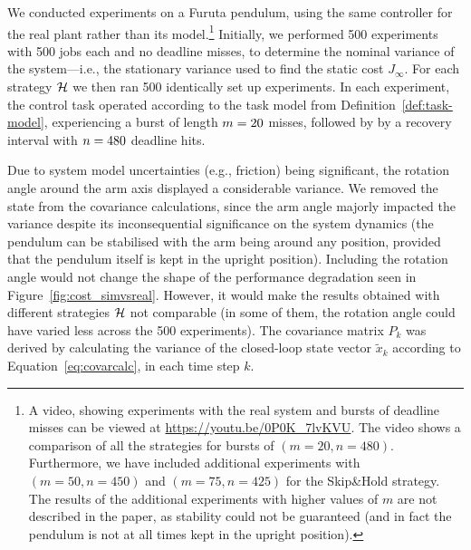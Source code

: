 We conducted experiments on a Furuta pendulum, using the same controller for the real plant rather than its model.\footnote{A video, showing experiments with the real system and bursts of deadline misses can be viewed at \url{https://youtu.be/0P0K_7lvKVU}. The video shows a comparison of all the strategies for bursts of $(m = 20, n=480)$. Furthermore, we have included additional experiments with $(m=50, n=450)$ and $(m=75, n=425)$ for the Skip\&Hold strategy. The results of the additional experiments with higher values of $m$ are not described in the paper, as stability could not be guaranteed (and in fact the pendulum is not at all times kept in the upright position).}
Initially, we performed 500 experiments with 500 jobs each and no deadline misses, to determine the nominal variance of the system---i.e., the stationary variance used to find the static cost $J_\infty$.
For each strategy $\mathcal{H}$ we then ran 500 identically set up experiments. 
In each experiment, the control task operated according to the task model from Definition~\ref{def:task-model}, experiencing a burst of length $m=20$ misses, followed by by a recovery interval with $n=480$ deadline hits.

Due to system model uncertainties (e.g., friction) being significant, the rotation angle around the arm axis displayed a considerable variance.
We removed the state from the covariance calculations, since the arm angle majorly impacted the variance despite its inconsequential significance on the system dynamics (the pendulum can be stabilised with the arm being around any position, provided that the pendulum itself is kept in the upright position).
Including the rotation angle would not change the shape of the performance degradation seen in Figure~\ref{fig:cost_simvsreal}. 
However, it would make the results obtained with different strategies $\mathcal{H}$ not comparable (in some of them, the rotation angle could have varied less across the 500 experiments). 
The covariance matrix $P_k$ was derived by calculating the variance of the closed-loop state vector $\tilde{x}_k$ according to Equation~\eqref{eq:covarcalc}, in each time step $k$. 

